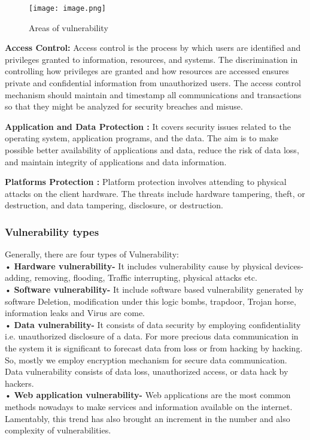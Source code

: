 \documentclass[conference]{IEEEtran}
\begin{document}
\begin{figure}[h]
    \centering
    \texttt{[image: image.png]}
    \caption{Areas of vulnerability}
\end{figure}

\textbf{Access Control: }
Access control is the process by which users are identified and privileges granted to information, resources, and systems. The discrimination in controlling how privileges are granted and how resources are accessed ensures private and confidential information from unauthorized users. The access control mechanism should maintain and timestamp all communications and transactions so that they might be analyzed for security breaches and misuse.

\textbf{Application and Data Protection :}
It covers security issues related to the operating system, application programs, and the data. The aim is to make possible better availability of applications and data, reduce the risk of data loss, and maintain integrity of applications and data information.

\textbf{Platforms Protection :}
Platform protection involves attending to physical attacks on the client hardware. The threats include hardware tampering, theft, or destruction, and data tampering, disclosure, or destruction.

\subsubsection{Vulnerability types}
Generally, there are four types of Vulnerability:
\\• \textbf{Hardware vulnerability-} It includes vulnerability cause by physical devices-adding, removing, flooding, Traffic interrupting, physical attacks etc.
\\• \textbf{Software vulnerability-} It include software based vulnerability generated by software Deletion, modification under this logic bombs, trapdoor, Trojan horse, information leaks and Virus are come.
\\• \textbf{Data vulnerability-} It consists of data security by employing confidentiality i.e. unauthorized disclosure of a data. For more precious data communication in the system it is significant to forecast data from loss or from hacking by hacking. So, mostly we employ encryption mechanism for secure data communication. Data vulnerability consists of data loss, unauthorized access, or data hack by hackers.
\\• \textbf{Web application vulnerability-} Web applications are the most common methods nowadays to make services and information available on the internet. Lamentably, this trend has also brought an increment in the number and also complexity of vulnerabilities.
\end{document}
